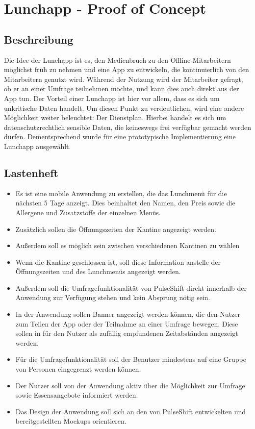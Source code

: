 \section{Lunchapp - Proof of Concept}
\label{section:realisation:lunchapp}

\subsection{Beschreibung}
Die Idee der Lunchapp ist es, den Medienbruch zu den Offline-Mitarbeitern möglichst früh zu nehmen und eine App zu entwickeln, die kontinuierlich von den Mitarbeitern genutzt wird. Während der Nutzung wird der Mitarbeiter gefragt, ob er an einer Umfrage teilnehmen möchte, und kann dies auch direkt aus der App tun. Der Vorteil einer Lunchapp ist hier vor allem, dass es sich um unkritische Daten handelt. Um diesen Punkt zu verdeutlichen, wird eine andere Möglichkeit weiter beleuchtet: Der Dienstplan. Hierbei handelt es sich um datenschutzrechtlich sensible Daten, die keineswegs frei verfügbar gemacht werden dürfen. Dementsprechend wurde für eine prototypische Implementierung eine Lunchapp ausgewählt.
\subsection{Lastenheft}

\begin{itemize}
\item Es ist eine mobile Anwendung zu erstellen, die das Lunchmenü für die nächsten 5 Tage anzeigt. Dies beinhaltet den Namen, den Preis sowie die Allergene und Zusatzstoffe der einzelnen Menüs.
\item Zusätzlich sollen die Öffnungszeiten der Kantine angezeigt werden. 
\item Außerdem soll es möglich sein zwischen verschiedenen Kantinen zu wählen
\item Wenn die Kantine geschlossen ist, soll diese Information anstelle der Öffnungszeiten und des Lunchmenüs angezeigt werden.
\item Außerdem soll die Umfragefunktionalität von PulseShift direkt innerhalb der Anwendung zur Verfügung stehen und kein Absprung nötig sein.
\item In der Anwendung sollen Banner angezeigt werden können, die den Nutzer zum Teilen der App oder der Teilnahme an einer Umfrage bewegen. Diese sollen in für den Nutzer als zufällig empfundenen Zeitabständen angezeigt werden.
\item Für die Umfragefunktionalität soll der Benutzer mindestens auf eine Gruppe von Personen eingegrenzt werden können.
\item Der Nutzer soll von der Anwendung aktiv über die Möglichkeit zur Umfrage sowie Essensangebote informiert werden.
\item Das Design der Anwendung soll sich an den von PulseShift entwickelten und bereitgestellten Mockups orientieren.
\end{itemize}

